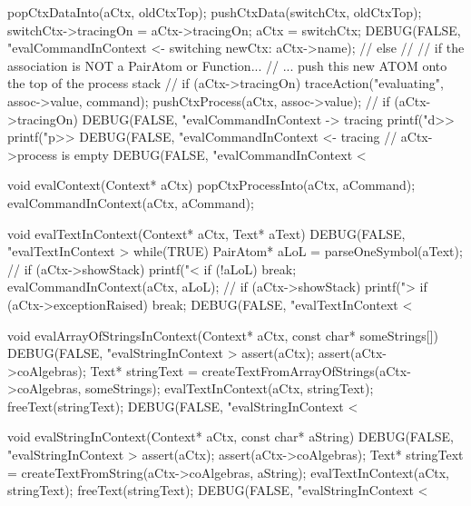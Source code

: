 {{{{        popCtxDataInto(aCtx, oldCtxTop);
        pushCtxData(switchCtx, oldCtxTop);
        switchCtx->tracingOn = aCtx->tracingOn;
        aCtx = switchCtx;
        DEBUG(FALSE, "evalCommandInContext <- switching newCtx: %
              aCtx->name);
        //
      } else {
        //
        // if the association is NOT a PairAtom or Function...
        // ... push this new ATOM onto the top of the process stack
        //
        if (aCtx->tracingOn) traceAction("evaluating", assoc->value, command);
        pushCtxProcess(aCtx, assoc->value);
        //
      }
    }
    if (aCtx->tracingOn) {
      DEBUG(FALSE, "evalCommandInContext -> tracing%
      printf("d>>%
      printf("p>>%
      DEBUG(FALSE, "evalCommandInContext <- tracing%
    }
  } // aCtx->process is empty
  DEBUG(FALSE, "evalCommandInContext < %
}

void evalContext(Context* aCtx) {
  popCtxProcessInto(aCtx, aCommand);
  evalCommandInContext(aCtx, aCommand);
}

void evalTextInContext(Context* aCtx, Text* aText) {
  DEBUG(FALSE, "evalTextInContext > %
  while(TRUE) {
    PairAtom* aLoL = parseOneSymbol(aText);
//    if (aCtx->showStack) printf("<%
    if (!aLoL) break;
    evalCommandInContext(aCtx, aLoL);
//    if (aCtx->showStack) printf(">%
    if (aCtx->exceptionRaised) break;
  }
  DEBUG(FALSE, "evalTextInContext < %
}

void evalArrayOfStringsInContext(Context* aCtx,
                                 const char* someStrings[]) {
  DEBUG(FALSE, "evalStringInContext > %
  assert(aCtx);
  assert(aCtx->coAlgebras);
  Text* stringText = createTextFromArrayOfStrings(aCtx->coAlgebras,
                                                  someStrings);
  evalTextInContext(aCtx, stringText);
  freeText(stringText);
  DEBUG(FALSE, "evalStringInContext < %
}

void evalStringInContext(Context* aCtx, const char* aString) {
  DEBUG(FALSE, "evalStringInContext > %
  assert(aCtx);
  assert(aCtx->coAlgebras);
  Text* stringText = createTextFromString(aCtx->coAlgebras, aString);
  evalTextInContext(aCtx, stringText);
  freeText(stringText);
  DEBUG(FALSE, "evalStringInContext < %
}
\stopCCode